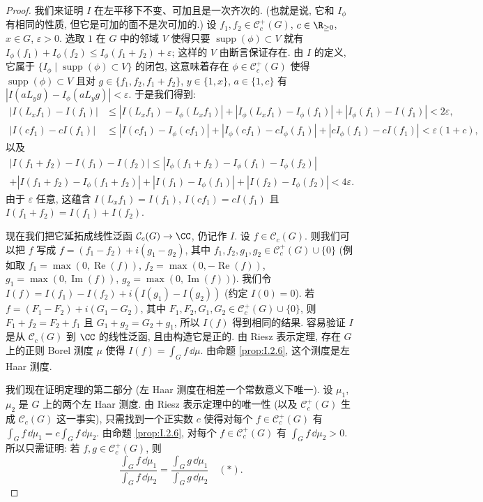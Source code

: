 \begin{proof}
我们来证明 $I$ 在左平移下不变、可加且是一次齐次的. (也就是说, 它和 $I_{\phi}$ 有相同的性质, 但它是可加的面不是次可加的.) 设 $f_1, f_2 \in \mathcal{C}_c^+(G)$, $c \in \R_{\geq 0}$, $x \in G$, $\varepsilon > 0$. 选取 $1$ 在 $G$ 中的邻域 $V$ 使得只要 $\operatorname{supp}(\phi) \subset V$ 就有 $I_{\phi}(f_1) + I_{\phi}(f_2) \leq I_{\phi}(f_1 + f_2) + \varepsilon$; 这样的 $V$ 由断言保证存在. 由 $I$ 的定义, 它属于 $\{I_{\phi} \mid \operatorname{supp}(\phi) \subset V\}$ 的闭包, 这意味着存在 $\phi \in \mathcal{C}_c^+(G)$ 使得 $\operatorname{supp}(\phi) \subset V$ 且对 $g \in \{f_1, f_2, f_1 + f_2\}$, $y \in \{1, x\}$, $a \in \{1, c\}$ 有 $|I(aL_yg) - I_{\phi}(aL_yg)| < \varepsilon$. 于是我们得到:
\begin{align*}
|I(L_xf_1) - I(f_1)| &\leq |I(L_xf_1) - I_{\phi}(L_xf_1)| + |I_{\phi}(L_xf_1) - I_{\phi}(f_1)| + |I_{\phi}(f_1) - I(f_1)| < 2\varepsilon, \\
|I(cf_1) - cI(f_1)| &\leq |I(cf_1) - I_{\phi}(cf_1)| + |I_{\phi}(cf_1) - cI_{\phi}(f_1)| + |cI_{\phi}(f_1) - cI(f_1)| < \varepsilon(1 + c),
\end{align*}
以及
\begin{multline*}
|I(f_1 + f_2) - I(f_1) - I(f_2)| \leq |I_{\phi}(f_1 + f_2) - I_{\phi}(f_1) - I_{\phi}(f_2)| \\
+ |I(f_1 + f_2) - I_{\phi}(f_1 + f_2)| + |I(f_1) - I_{\phi}(f_1)| + |I(f_2) - I_{\phi}(f_2)| < 4\varepsilon.
\end{multline*}
由于 $\varepsilon$ 任意, 这蕴含 $I(L_xf_1) = I(f_1)$, $I(cf_1) = cI(f_1)$ 且 $I(f_1 + f_2) = I(f_1) + I(f_2)$.

现在我们把它延拓成线性泛函 $\mathcal{C}_c(G) \to \CC$, 仍记作 $I$. 设 $f \in \mathcal{C}_c(G)$. 则我们可以把 $f$ 写成 $f = (f_1 - f_2) + i(g_1 - g_2)$, 其中 $f_1, f_2, g_1, g_2 \in \mathcal{C}_c^+(G) \cup \{0\}$ (例如取 $f_1 = \max(0, \operatorname{Re}(f))$, $f_2 = \max(0, -\operatorname{Re}(f))$, $g_1 = \max(0, \operatorname{Im}(f))$, $g_2 = \max(0, \operatorname{Im}(f))$). 我们令 $I(f) = I(f_1) - I(f_2) + i(I(g_1) - I(g_2))$ (约定 $I(0) = 0$). 若 $f = (F_1 - F_2) + i(G_1 - G_2)$, 其中 $F_1, F_2, G_1, G_2 \in \mathcal{C}_c^+(G) \cup \{0\}$, 则 $F_1 + f_2 = F_2 + f_1$ 且 $G_1 + g_2 = G_2 + g_1$, 所以 $I(f)$ 得到相同的结果. 容易验证 $I$ 是从 $\mathcal{C}_c(G)$ 到 $\CC$ 的线性泛函, 且由构造它是正的. 由 Riesz 表示定理, 存在 $G$ 上的正则 Borel 测度 $\mu$ 使得 $I(f) = \int_G f \,\dd\mu$. 由命题 \ref{prop:I.2.6}, 这个测度是左 Haar 测度.

我们现在证明定理的第二部分 (左 Haar 测度在相差一个常数意义下唯一). 设 $\mu_1$, $\mu_2$ 是 $G$ 上的两个左 Haar 测度. 由 Riesz 表示定理中的唯一性 (以及 $\mathcal{C}_c^+(G)$ 生成 $\mathcal{C}_c(G)$ 这一事实), 只需找到一个正实数 $c$ 使得对每个 $f \in \mathcal{C}_c^+(G)$ 有 $\int_G f \,\dd\mu_1 = c\int_G f \,\dd\mu_2$. 由命题 \ref{prop:I.2.6}, 对每个 $f \in \mathcal{C}_c^+(G)$ 有 $\int_G f \,\dd\mu_2 > 0$. 所以只需证明: 若 $f, g \in \mathcal{C}_c^+(G)$, 则
\begin{equation}
\label{eq:I.2.star}
\frac{\int_G f \,\dd\mu_1}{\int_G f \,\dd\mu_2} = \frac{\int_G g \,\dd\mu_1}{\int_G g \,\dd\mu_2} \quad (*).
\end{equation}


\end{proof}
